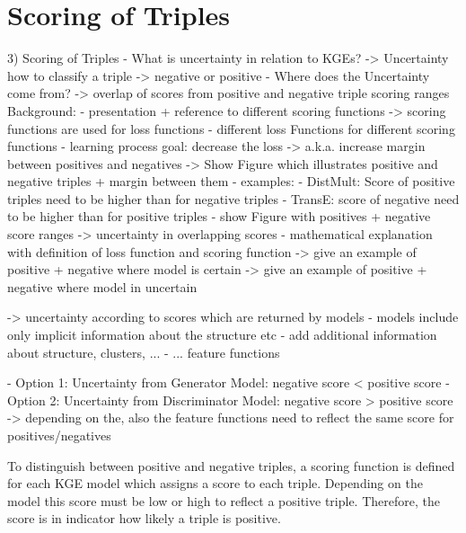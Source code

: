 \section{Scoring of Triples} 
\label{sec:scoring_of_triples}

3) Scoring of Triples
- What is uncertainty in relation to KGEs?
-> Uncertainty how to classify a triple -> negative or positive
- Where does the Uncertainty come from?
-> overlap of scores from positive and negative triple scoring ranges
Background: 
- presentation + reference to different scoring functions
-> scoring functions are used for loss functions
- different loss Functions for different scoring functions
- learning process goal: decrease the loss
-> a.k.a. increase margin between positives and negatives
-> Show Figure which illustrates positive and negative triples + margin between them
- examples:
    - DistMult: Score of positive triples need to be higher than for negative triples
    - TransE: score of negative need to be higher than for positive triples
- show Figure with positives + negative score ranges -> uncertainty in overlapping scores
- mathematical explanation with definition of loss function and scoring function
-> give an example of positive + negative where model is certain
-> give an example of positive + negative where model in uncertain

-> uncertainty according to scores which are returned by models
- models include only implicit information about the structure etc
- add additional information about structure, clusters, ...
- ... feature functions

- Option 1: Uncertainty from Generator Model: negative score < positive score
- Option 2: Uncertainty from Discriminator Model: negative score > positive score
-> depending on the, also the feature functions need to reflect the same score for positives/negatives


To distinguish between positive and negative triples, a scoring function is defined for each \ac{KGE} model which assigns a score to each triple.
Depending on the model this score must be low or high to reflect a positive triple.
Therefore, the score is in indicator how likely a triple is positive.

